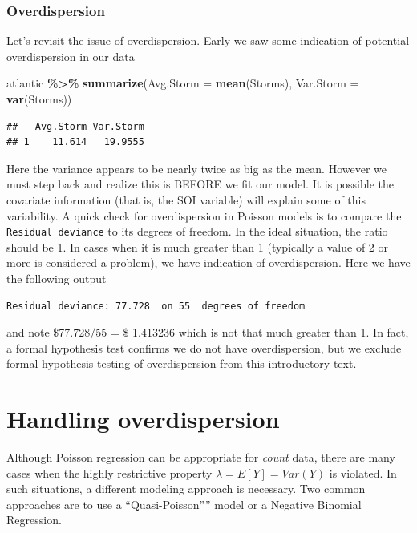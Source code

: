 \documentclass[
]{book}
\newenvironment{Shaded}{\begin{snugshade}}{\end{snugshade}}
\newcommand{\AttributeTok}[1]{\textcolor[rgb]{0.13,0.29,0.53}{#1}}
\newcommand{\FunctionTok}[1]{\textcolor[rgb]{0.13,0.29,0.53}{\textbf{#1}}}
\newcommand{\NormalTok}[1]{#1}
\newcommand{\SpecialCharTok}[1]{\textcolor[rgb]{0.81,0.36,0.00}{\textbf{#1}}}
\begin{document}
\hypertarget{overdispersion}{%
\subsubsection{Overdispersion}\label{overdispersion}}

Let's revisit the issue of overdispersion. Early we saw some indication of potential overdispersion in our data

\begin{Shaded}
\begin{Highlighting}[]
\NormalTok{atlantic }\SpecialCharTok{\%\textgreater{}\%} \FunctionTok{summarize}\NormalTok{(}\AttributeTok{Avg.Storm =} \FunctionTok{mean}\NormalTok{(Storms),}
                       \AttributeTok{Var.Storm =} \FunctionTok{var}\NormalTok{(Storms))}
\end{Highlighting}
\end{Shaded}

\begin{verbatim}
##   Avg.Storm Var.Storm
## 1    11.614   19.9555
\end{verbatim}

Here the variance appears to be nearly twice as big as the mean. However we must step back and realize this is BEFORE we fit our model. It is possible the covariate information (that is, the SOI variable) will explain some of this variability. A quick check for overdispersion in Poisson models is to compare the \texttt{Residual\ deviance} to its degrees of freedom. In the ideal situation, the ratio should be 1. In cases when it is much greater than 1 (typically a value of 2 or more is considered a problem), we have indication of overdispersion. Here we have the following output

\begin{verbatim}
Residual deviance: 77.728  on 55  degrees of freedom
\end{verbatim}

and note \$77.728/55 = \$ 1.413236 which is not that much greater than 1. In fact, a formal hypothesis test confirms we do not have overdispersion, but we exclude formal hypothesis testing of overdispersion from this introductory text.

\hypertarget{handling-overdispersion}{%
\section{Handling overdispersion}\label{handling-overdispersion}}

Although Poisson regression can be appropriate for \emph{count} data, there are many cases when the highly restrictive property \(\lambda = E[Y] = Var(Y)\) is violated. In such situations, a different modeling approach is necessary. Two common approaches are to use a ``Quasi-Poisson'''' model or a Negative Binomial Regression.
\end{document}

